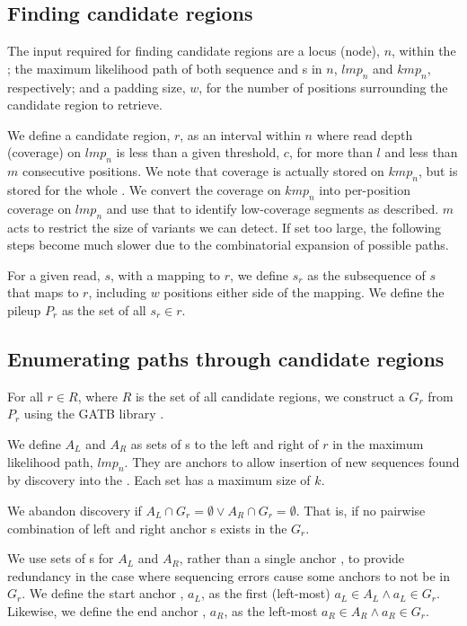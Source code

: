\subsection{Finding candidate regions}
\label{sec:denovo-candidate-regions}

The input required for finding candidate regions are a locus \prg{} (node), $n$, within the \pandora{} \panrg{}; the maximum likelihood path of both sequence and \kmer{}s in $n$, $lmp_n$ and $kmp_n$, respectively; and a padding size, $w$, for the number of positions surrounding the candidate region to retrieve.

We define a candidate region, $r$, as an interval within $n$ where read depth (coverage) on $lmp_n$ is less than a given threshold, $c$, for more than $l$ and less than $m$ consecutive positions. We note that coverage is actually stored on $kmp_n$, but is stored for the whole \kmer{}. We convert the coverage on $kmp_n$ into per-position coverage on $lmp_n$ and use that to identify low-coverage segments as described. $m$ acts to restrict the size of variants we can detect. If set too large, the following steps become much slower due to the combinatorial expansion of possible paths. 

For a given read, $s$, with a mapping to $r$, we define $s_r$ as the subsequence of $s$ that maps to $r$, including $w$ positions either side of the mapping. We define the pileup $P_r$ as the set of all $s_r \in r$.

\subsection{Enumerating paths through candidate regions}
\label{sec:path-enum}

For all $r \in R$, where $R$ is the set of all candidate regions, we construct a \dbg{} $G_r$ from $P_r$ using the GATB library \cite{gatb2014}. 

We define $A_L$ and $A_R$ as sets of \kmer{}s to the left and right of $r$ in the maximum likelihood path, $lmp_n$. They are anchors to allow insertion of new sequences found by \denovo{} discovery into the \prg{}. Each set has a maximum size of $k$.

We abandon \denovo{} discovery if $A_L \cap G_r = \emptyset \lor A_R \cap G_r = \emptyset$. That is, if no pairwise combination of left and right anchor \kmer{}s exists in the \dbg{} $G_r$.

We use sets of \kmer{}s for $A_L$ and $A_R$, rather than a single anchor \kmer{}, to provide redundancy in the case where sequencing errors cause some anchors to not be in $G_r$. We define the start anchor \kmer{}, $a_L$, as the first (left-most) $a_L \in A_L \land a_L \in G_r$. Likewise, we define the end anchor \kmer{}, $a_R$, as the left-most $a_R \in A_R \land a_R \in G_r$.

